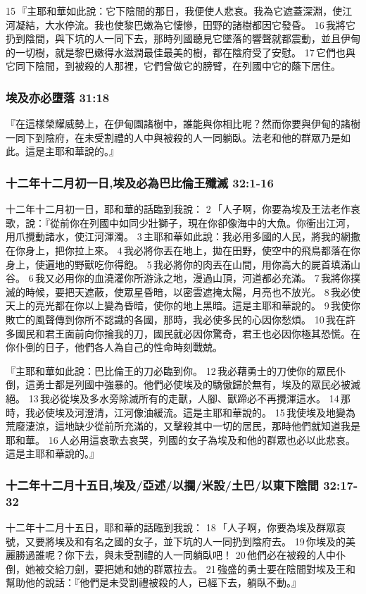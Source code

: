 15 『主耶和華如此說：它下陰間的那日，我便使人悲哀。我為它遮蓋深淵，使江河凝結，大水停流。我也使黎巴嫩為它悽慘，田野的諸樹都因它發昏。 16 我將它扔到陰間，與下坑的人一同下去，那時列國聽見它墜落的響聲就都震動，並且伊甸的一切樹，就是黎巴嫩得水滋潤最佳最美的樹，都在陰府受了安慰。 17 它們也與它同下陰間，到被殺的人那裡，它們曾做它的膀臂，在列國中它的蔭下居住。

\subsubsection{埃及亦必墮落 31:18}
『在這樣榮耀威勢上，在伊甸園諸樹中，誰能與你相比呢？然而你要與伊甸的諸樹一同下到陰府，在未受割禮的人中與被殺的人一同躺臥。法老和他的群眾乃是如此。這是主耶和華說的。』


\subsubsection{十二年十二月初一日,埃及必為巴比倫王殲滅 32:1-16}
十二年十二月初一日，耶和華的話臨到我說： 2 「人子啊，你要為埃及王法老作哀歌，說：『從前你在列國中如同少壯獅子，現在你卻像海中的大魚。你衝出江河，用爪攪動諸水，使江河渾濁。 3 主耶和華如此說：我必用多國的人民，將我的網撒在你身上，把你拉上來。 4 我必將你丟在地上，拋在田野，使空中的飛鳥都落在你身上，使遍地的野獸吃你得飽。 5 我必將你的肉丟在山間，用你高大的屍首填滿山谷。 6 我又必用你的血澆灌你所游泳之地，漫過山頂，河道都必充滿。 7 我將你撲滅的時候，要把天遮蔽，使眾星昏暗，以密雲遮掩太陽，月亮也不放光。 8 我必使天上的亮光都在你以上變為昏暗，使你的地上黑暗。這是主耶和華說的。 9 我使你敗亡的風聲傳到你所不認識的各國，那時，我必使多民的心因你愁煩。 10 我在許多國民和君王面前向你掄我的刀，國民就必因你驚奇，君王也必因你極其恐慌。在你仆倒的日子，他們各人為自己的性命時刻戰兢。

『主耶和華如此說：巴比倫王的刀必臨到你。 12 我必藉勇士的刀使你的眾民仆倒，這勇士都是列國中強暴的。他們必使埃及的驕傲歸於無有，埃及的眾民必被滅絕。 13 我必從埃及多水旁除滅所有的走獸，人腳、獸蹄必不再攪渾這水。 14 那時，我必使埃及河澄清，江河像油緩流。這是主耶和華說的。 15 我使埃及地變為荒廢淒涼，這地缺少從前所充滿的，又擊殺其中一切的居民，那時他們就知道我是耶和華。 16 人必用這哀歌去哀哭，列國的女子為埃及和他的群眾也必以此悲哀。這是主耶和華說的。』


\subsubsection{十二年十二月十五日,埃及/亞述/以攔/米設/土巴/以東下陰間 32:17-32}
十二年十二月十五日，耶和華的話臨到我說： 18 「人子啊，你要為埃及群眾哀號，又要將埃及和有名之國的女子，並下坑的人一同扔到陰府去。 19 你埃及的美麗勝過誰呢？你下去，與未受割禮的人一同躺臥吧！ 20 他們必在被殺的人中仆倒，她被交給刀劍，要把她和她的群眾拉去。 21 強盛的勇士要在陰間對埃及王和幫助他的說話：『他們是未受割禮被殺的人，已經下去，躺臥不動。』


